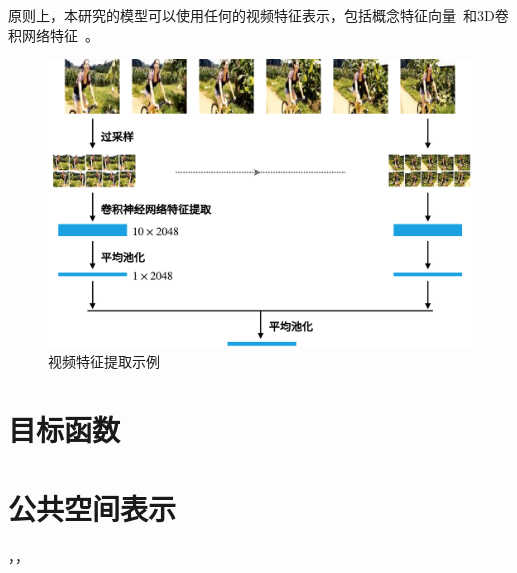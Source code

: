 原则上，本研究的模型可以使用任何的视频特征表示，包括概念特征向量~\cite{}和3D卷积网络特征~\cite{}。

\begin{figure}[tbhp!]
    \centering
    \includegraphics[width=\linewidth]{figures/video-cnn-feat}
    \caption[视频特征提取示例]{视频特征提取示例}
    \label{fig:video-cnn-feat}
\end{figure}


\section{目标函数}




\section{公共空间表示}



，，
